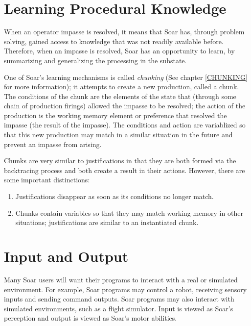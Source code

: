 \section{Learning Procedural Knowledge}
\label{ARCH-learning} 

When an operator impasse is resolved, it means that Soar has, through problem 
solving, gained access to knowledge that was not readily available before. Therefore,
when an impasse is resolved, Soar has an opportunity to learn, by summarizing
and generalizing the processing in the substate.

One of Soar's learning mechanisms is called \textit{chunking} 
(See chapter \ref{CHUNKING} for more information); it attempts to
create a new production, called a chunk. The conditions of 
the chunk are the elements of the state that (through some chain of 
production firings) allowed the impasse to be resolved; the action of the 
production is the working memory element or preference that resolved the impasse
(the result of the impasse). The conditions and action are variablized so that this
new production may match in a similar situation in the future and
prevent an impasse from arising. 

Chunks are very similar to justifications in that they are both
formed via the backtracing process and both create a result in their
actions. However, there are some important distinctions:\vspace{-12pt}
\begin{enumerate}
\item Justifications disappear as soon as its conditions no longer match. \vspace{-8pt}
\item Chunks contain variables so that they may match working memory in other
	situations; justifications are similar to an instantiated chunk.
\end{enumerate}




\section{Input and Output}
\label{ARCH-io}	%

Many Soar users will want their programs to interact with a real or simulated
environment. For example, Soar programs may control a robot, receiving sensory
inputs and sending command outputs. Soar programs may also interact with
simulated environments, such as a flight simulator. Input is viewed as
Soar's perception and output is viewed as Soar's motor abilities.

